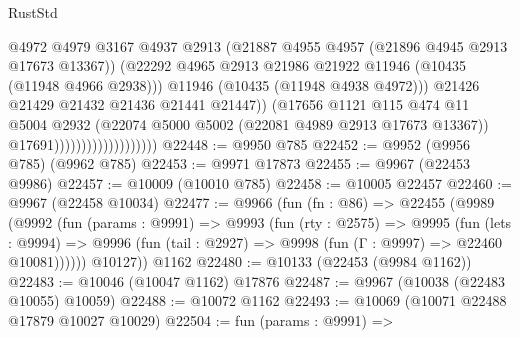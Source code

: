 \begin{lexlean}{RustStd}
\begin{coremodule}
{\begin{coremodule}
{{{{{{{{{{{{{{{{{{{{{{{{{{{{{{{{{{{{{{{{{{{{{{{{{{{{{{{{{{{{{{{{{{{{{{{{{{{{{{                                              @4972
                                              @4979
                                              @3167
                                              @4937
                                              @2913
                                              (@21887
                                                @4955
                                                @4957
                                                (@21896 @4945 @2913 @17673 @13367))
                                              (@22292
                                                @4965
                                                @2913
                                                @21986
                                                @21922
                                                @11946
                                                (@10435 (@11948 @4966 @2938)))
                                              @11946
                                              (@10435 (@11948 @4938 @4972)))
                                            @21426
                                            @21429
                                            @21432
                                            @21436
                                            @21441
                                            @21447))
                                        (@17656
                                          @1121
                                          @115
                                          @474
                                          @11
                                          @5004
                                          @2932
                                          (@22074 @5000 @5002 (@22081 @4989 @2913 @17673 @13367))
                                          @17691)))))))))))))))))))
@22448 := @9950 @785
@22452 := @9952 (@9956 @785) (@9962 @785)
@22453 := @9971 @17873
@22455 := @9967 (@22453 @9986)
@22457 := @10009 (@10010 @785)
@22458 := @10005 @22457
@22460 := @9967 (@22458 @10034)
@22477 := @9966
    (fun (fn : @86) =>
    @22455
      (@9989
        (@9992
          (fun (params : @9991) =>
          @9993
            (fun (rty : @2575) =>
            @9995
              (fun (lets : @9994) =>
              @9996 (fun (tail : @2927) => @9998 (fun (Γ : @9997) => @22460 @10081))))))
        @10127))
    @1162
@22480 := @10133 (@22453 (@9984 @1162))
@22483 := @10046 (@10047 @1162) @17876
@22487 := @9967 (@10038 (@22483 @10055) @10059)
@22488 := @10072 @1162
@22493 := @10069 (@10071 @22488 @17879 @10027 @10029)
@22504 := fun (params : @9991) =>
}}}}}}}}}}}}}}}}}}}}}}}}}}}}}}}}}}}}}}}}}}}}}}}}}}}}}}}}}}}}}}}}}}}}}}}}}}}}}}
\end{coremodule}}
\end{coremodule}
\end{lexlean}
